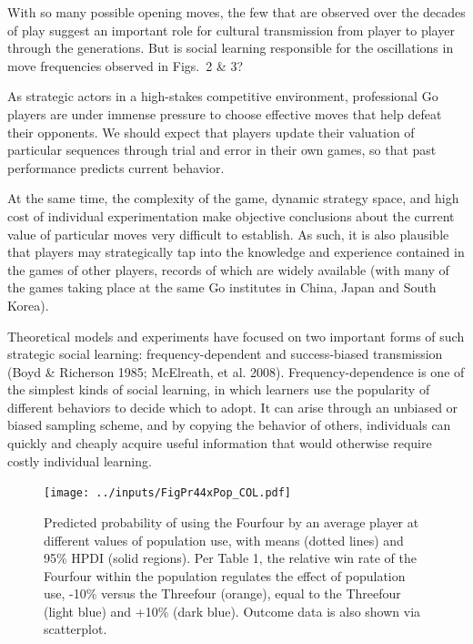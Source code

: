 \documentclass{article}
\begin{document}
With so many possible opening moves, the few that are observed over the decades of play suggest an important role for cultural transmission from player to player through the generations.  But is social learning responsible for the oscillations in move frequencies observed in Figs.~2 \& 3?

As strategic actors in a high-stakes competitive environment, professional Go players are under immense pressure to choose effective moves that help defeat their opponents.  We should expect that players update their valuation of particular sequences through trial and error in their own games, so that past performance predicts current behavior.

At the same time, the complexity of the game, dynamic strategy space, and high cost of individual experimentation make objective conclusions about the current value of particular moves very difficult to establish.  As such, it is also plausible that players may strategically tap into the knowledge and experience contained in the games of other players, records of which are widely available (with many of the games taking place at the same Go institutes in China, Japan and South Korea).

Theoretical models and experiments have focused on two important forms of such strategic social learning: frequency-dependent and success-biased transmission (Boyd \& Richerson 1985; McElreath, et al. 2008).  Frequency-dependence is one of the simplest kinds of social learning, in which learners use the popularity of different behaviors to decide which to adopt.  It can arise through an unbiased or biased sampling scheme, and by copying the behavior of others, individuals can quickly and cheaply acquire useful information that would otherwise require costly individual learning.

\begin{figure}[t]
\begin{center}
\texttt{[image: ../inputs/FigPr44xPop\_COL.pdf]}
\caption{Predicted probability of using the Fourfour by an average player at different values of population use, with means (dotted lines) and 95\% HPDI (solid regions).  Per Table 1, the relative win rate of the Fourfour within the population regulates the effect of population use, -10\% versus the Threefour (orange), equal to the Threefour (light blue) and +10\% (dark blue).  Outcome data is also shown via scatterplot.}
\label{FigPr44}
\end{center}
\end{figure}
\end{document}
